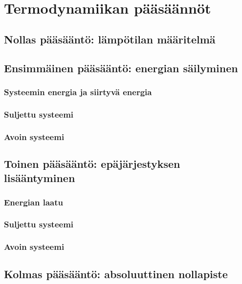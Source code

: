 \documentclass[12pt,a4paper,finnish]{book}
\begin{document}
\chapter{Termodynamiikan pääsäännöt} %

\section{Nollas pääsääntö: lämpötilan määritelmä}

\section{Ensimmäinen pääsääntö: energian säilyminen}

\subsection{Systeemin energia ja siirtyvä energia}

\subsection{Suljettu systeemi}

\subsection{Avoin systeemi}

\section{Toinen pääsääntö: epäjärjestyksen lisääntyminen}

\subsection{Energian laatu}

\subsection{Suljettu systeemi}

\subsection{Avoin systeemi}

\section{Kolmas pääsääntö: absoluuttinen nollapiste}
\end{document}
